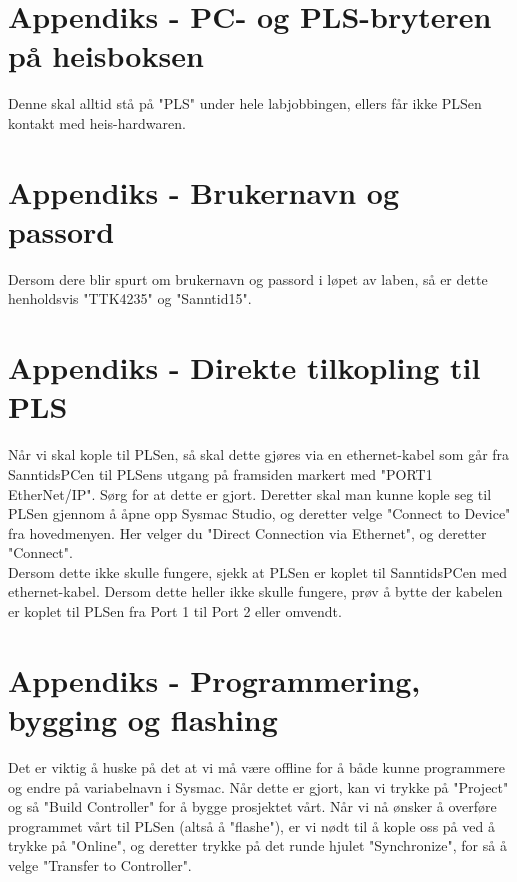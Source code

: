 \appendix
\section{Appendiks - PC- og PLS-bryteren på heisboksen}
Denne skal alltid stå på "PLS" under hele labjobbingen, ellers får ikke PLSen kontakt med heis-hardwaren.

\section{Appendiks - Brukernavn og passord}
Dersom dere blir spurt om brukernavn og passord i løpet av laben, så er dette henholdsvis "TTK4235" og "Sanntid15".

\section{Appendiks - Direkte tilkopling til PLS}
Når vi skal kople til PLSen, så skal dette gjøres via en ethernet-kabel som går fra SanntidsPCen til PLSens utgang på framsiden markert med "PORT1 EtherNet/IP". Sørg for at dette er gjort. Deretter skal man kunne kople seg til PLSen gjennom å åpne opp Sysmac Studio, og deretter velge "Connect to Device" fra hovedmenyen.  Her velger du "Direct Connection via Ethernet", og deretter "Connect".\\

Dersom dette ikke skulle fungere, sjekk at PLSen er koplet til SanntidsPCen med ethernet-kabel. Dersom dette heller ikke skulle fungere, prøv å bytte der kabelen er koplet til PLSen fra Port 1 til Port 2 eller omvendt.


\section{Appendiks - Programmering, bygging og flashing}
Det er viktig å huske på det at vi må være offline for å både kunne programmere og endre på variabelnavn i Sysmac. Når dette er gjort, kan vi trykke på "Project" og så "Build Controller" for å bygge prosjektet vårt. Når vi nå ønsker å overføre programmet vårt til PLSen (altså å "flashe"), er vi nødt til å kople oss på ved å trykke på "Online", og deretter trykke på det runde hjulet "Synchronize", for så å velge "Transfer to Controller".\\

